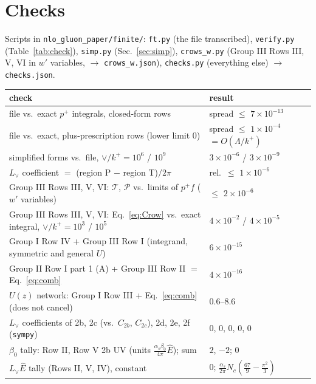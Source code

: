 \documentclass[10pt]{article}
\numberwithin{equation}{section}
\newcommand{\Lv}{L_{\vee}}
\newcommand{\Eh}{\hat E}
\begin{document}
\section{Checks}\label{sec:checks}
Scripts in \texttt{nlo\_gluon\_paper/finite/}: \texttt{ft.py} (the file transcribed), \texttt{verify.py} (Table~\ref{tab:check}), \texttt{simp.py} (Sec.~\ref{sec:simp}), \texttt{crows\_w.py} (Group III Rows III, V, VI in $w'$ variables, $\to$ \texttt{crows\_w.json}), \texttt{checks.py} (everything else) $\to$ \texttt{checks.json}.
\begin{table}[H]\centering\small
\begin{tabular}{@{}p{}p{}@{}}\toprule
check & result\\\midrule
file vs.\ exact $p^+$ integrals, closed-form rows & spread $\le$ $7\times10^{-13}$\\
file vs.\ exact, plus-prescription rows (lower limit $0$) & spread $\le$ $1\times10^{-4}$ $=O(\Lambda/k^+)$\\
simplified forms vs.\ file, $\vee/k^+=10^6$ / $10^9$ & $3\times10^{-6}$ / $3\times10^{-9}$\\
$\Lv$ coefficient $=$ (region P $-$ region T)$/2\pi$ & rel.\ $\le$ $1\times10^{-6}$\\
Group III Rows III, V, VI: $\mathcal T$, $\mathcal P$ vs.\ limits of $p^+f$ ($w'$ variables) & $\le$ $2\times10^{-6}$\\
Group III Rows III, V, VI: Eq.~\eqref{eq:Crow} vs.\ exact integral, $\vee/k^+=10^3$ / $10^5$ & $4\times10^{-2}$ / $4\times10^{-5}$\\
Group I Row IV + Group III Row I (integrand, symmetric and general $U$) & $6\times10^{-15}$\\
Group II Row I part 1 (A) + Group III Row II $=$ Eq.~\eqref{eq:comb} & $4\times10^{-16}$\\
$U(z)$ network: Group I Row III + Eq.~\eqref{eq:comb} (does not cancel) & 0.6--8.6\\
$\Lv$ coefficients of 2b, 2c (vs.\ $C_{2b}$, $C_{2c}$), 2d, 2e, 2f (\texttt{sympy}) & $0$, $0$, $0$, $0$, $0$\\
$\beta_0$ tally: Row II, Row V 2b UV (units $\frac{\alpha_s\beta_0}{4\pi}\Eh$); sum & $2$, $-2$; $0$\\
$\Lv\Eh$ tally (Rows II, V, IV), constant & $0$; $\frac{\alpha_s}{2\pi}N_c(\frac{67}{9}-\frac{\pi^2}{3})$\\\bottomrule
\end{tabular}
\end{table}
\end{document}
